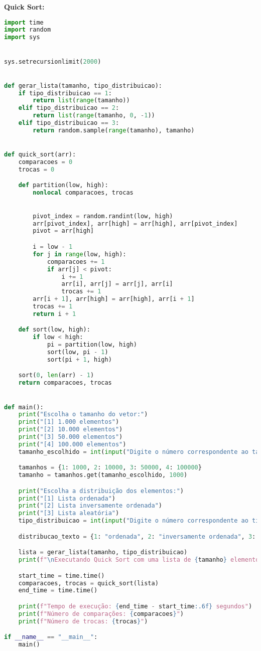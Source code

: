 \documentclass[a4paper,12pt]{article}
\begin{document}
 \textbf{Quick Sort: } \\
\begin{lstlisting}[language=Python]
import time
import random
import sys


sys.setrecursionlimit(2000)


def gerar_lista(tamanho, tipo_distribuicao):
    if tipo_distribuicao == 1:
        return list(range(tamanho))
    elif tipo_distribuicao == 2:
        return list(range(tamanho, 0, -1))
    elif tipo_distribuicao == 3:
        return random.sample(range(tamanho), tamanho)


def quick_sort(arr):
    comparacoes = 0
    trocas = 0

    def partition(low, high):
        nonlocal comparacoes, trocas

        
        pivot_index = random.randint(low, high)
        arr[pivot_index], arr[high] = arr[high], arr[pivot_index]
        pivot = arr[high]

        i = low - 1
        for j in range(low, high):
            comparacoes += 1
            if arr[j] < pivot:
                i += 1
                arr[i], arr[j] = arr[j], arr[i]
                trocas += 1
        arr[i + 1], arr[high] = arr[high], arr[i + 1]
        trocas += 1
        return i + 1

    def sort(low, high):
        if low < high:
            pi = partition(low, high)
            sort(low, pi - 1)
            sort(pi + 1, high)

    sort(0, len(arr) - 1)
    return comparacoes, trocas


def main():
    print("Escolha o tamanho do vetor:")
    print("[1] 1.000 elementos")
    print("[2] 10.000 elementos")
    print("[3] 50.000 elementos")
    print("[4] 100.000 elementos")
    tamanho_escolhido = int(input("Digite o número correspondente ao tamanho do vetor: "))

    tamanhos = {1: 1000, 2: 10000, 3: 50000, 4: 100000}
    tamanho = tamanhos.get(tamanho_escolhido, 1000)

    print("Escolha a distribuição dos elementos:")
    print("[1] Lista ordenada")
    print("[2] Lista inversamente ordenada")
    print("[3] Lista aleatória")
    tipo_distribuicao = int(input("Digite o número correspondente ao tipo de distribuição: "))

    distribucao_texto = {1: "ordenada", 2: "inversamente ordenada", 3: "aleatória"}

    lista = gerar_lista(tamanho, tipo_distribuicao)
    print(f"\nExecutando Quick Sort com uma lista de {tamanho} elementos ({distribucao_texto[tipo_distribuicao]}).\n")

    start_time = time.time()
    comparacoes, trocas = quick_sort(lista)
    end_time = time.time()

    print(f"Tempo de execução: {end_time - start_time:.6f} segundos")
    print(f"Número de comparações: {comparacoes}")
    print(f"Número de trocas: {trocas}")

if __name__ == "__main__":
    main()


\end{lstlisting}
\end{document}
